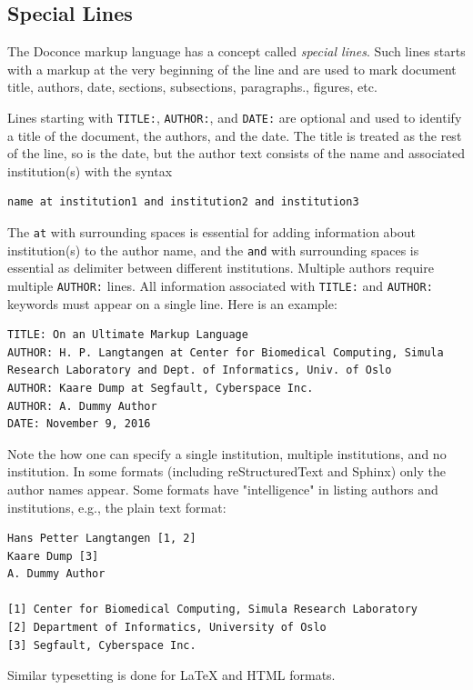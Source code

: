 \documentclass{article}
\begin{document}
\subsection{Special Lines}

The Doconce markup language has a concept called \emph{special lines}.
Such lines starts with a markup at the very beginning of the
line and are used to mark document title, authors, date,
sections, subsections, paragraphs., figures, etc.

  

Lines starting with {\fontsize{10pt}{10pt}\verb!TITLE:!}, {\fontsize{10pt}{10pt}\verb!AUTHOR:!}, and {\fontsize{10pt}{10pt}\verb!DATE:!} are optional and used
to identify a title of the document, the authors, and the date. The
title is treated as the rest of the line, so is the date, but the
author text consists of the name and associated institution(s) with
the syntax 
\begin{Verbatim}[fontsize=\fontsize{9pt}{9pt},tabsize=8,baselinestretch=0.85,
fontfamily=tt,xleftmargin=7mm]
name at institution1 and institution2 and institution3
\end{Verbatim}
\noindent
The {\fontsize{10pt}{10pt}\verb!at!} with surrounding spaces
is essential for adding information about institution(s)
to the author name, and the {\fontsize{10pt}{10pt}\verb!and!} with surrounding spaces is
essential as delimiter between different institutions.
Multiple authors require multiple {\fontsize{10pt}{10pt}\verb!AUTHOR:!} lines. All information
associated with {\fontsize{10pt}{10pt}\verb!TITLE:!} and {\fontsize{10pt}{10pt}\verb!AUTHOR:!} keywords must appear on a single
line.  Here is an example:
\begin{Verbatim}[fontsize=\fontsize{9pt}{9pt},tabsize=8,baselinestretch=0.85,
fontfamily=tt,xleftmargin=7mm]
TITLE: On an Ultimate Markup Language
AUTHOR: H. P. Langtangen at Center for Biomedical Computing, Simula Research Laboratory and Dept. of Informatics, Univ. of Oslo
AUTHOR: Kaare Dump at Segfault, Cyberspace Inc.
AUTHOR: A. Dummy Author
DATE: November 9, 2016
\end{Verbatim}
\noindent
Note the how one can specify a single institution, multiple institutions,
and no institution. In some formats (including reStructuredText and Sphinx)
only the author names appear. Some formats have
"intelligence" in listing authors and institutions, e.g., the plain text
format:
\begin{Verbatim}[fontsize=\fontsize{9pt}{9pt},tabsize=8,baselinestretch=0.85,
fontfamily=tt,xleftmargin=7mm]
Hans Petter Langtangen [1, 2]
Kaare Dump [3]
A. Dummy Author 

[1] Center for Biomedical Computing, Simula Research Laboratory
[2] Department of Informatics, University of Oslo
[3] Segfault, Cyberspace Inc.
\end{Verbatim}
\noindent
Similar typesetting is done for {\LaTeX} and HTML formats.
\end{document}
